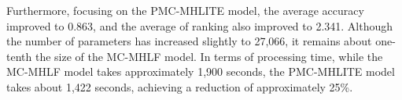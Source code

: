 \documentclass[conference]{IEEEtran}
\begin{document}

Furthermore, focusing on the PMC-MHLITE model, the average accuracy improved to 0.863, and the average of ranking also improved to 2.341. Although the number of parameters has increased slightly to 27,066, it remains about one-tenth the size of the MC-MHLF model. In terms of processing time, while the MC-MHLF model takes approximately 1,900 seconds, the PMC-MHLITE model takes about 1,422 seconds, achieving a reduction of approximately 25\%.



%
%
%
%
\end{document}
